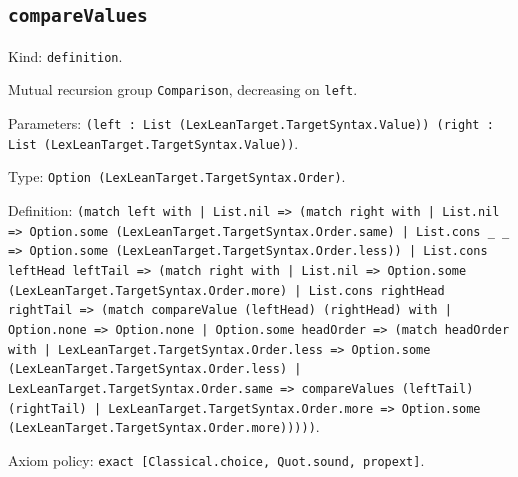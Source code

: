 \documentclass[11pt]{article}
\begin{document}
\subsection*{\texttt{compareValues}}
\noindent Kind: \texttt{definition}.\par
\noindent Mutual recursion group \texttt{Comparison}, decreasing on \texttt{left}.\par
\noindent Parameters: \texttt{(left : List (LexLeanTarget.TargetSyntax.Value)) (right : List (LexLeanTarget.TargetSyntax.Value))}.\par
\noindent Type: \texttt{Option (LexLeanTarget.TargetSyntax.Order)}.\par
\noindent Definition: \texttt{(match left with | List.nil => (match right with | List.nil => Option.some (LexLeanTarget.TargetSyntax.Order.same) | List.cons \_ \_ => Option.some (LexLeanTarget.TargetSyntax.Order.less)) | List.cons leftHead leftTail => (match right with | List.nil => Option.some (LexLeanTarget.TargetSyntax.Order.more) | List.cons rightHead rightTail => (match compareValue (leftHead) (rightHead) with | Option.none => Option.none | Option.some headOrder => (match headOrder with | LexLeanTarget.TargetSyntax.Order.less => Option.some (LexLeanTarget.TargetSyntax.Order.less) | LexLeanTarget.TargetSyntax.Order.same => compareValues (leftTail) (rightTail) | LexLeanTarget.TargetSyntax.Order.more => Option.some (LexLeanTarget.TargetSyntax.Order.more)))))}.\par
\noindent Axiom policy: \texttt{exact [Classical.choice, Quot.sound, propext]}.\par
\end{document}
